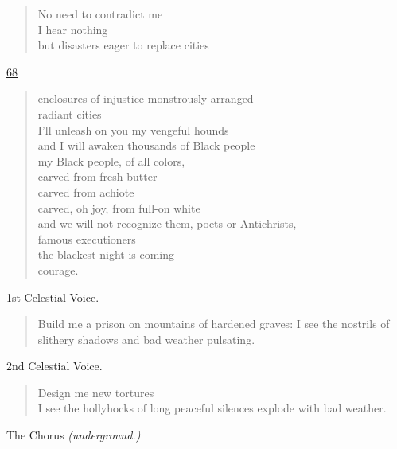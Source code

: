 \documentclass[letterpaper,article,12pt,oneside,notitlepage]{memoir}
\begin{document}
\begin{verse}
No need to contradict me \\
I hear nothing \\
but disasters eager to replace cities \\
\end{verse}

\clearpage

\href{http://cesaire.elotroalex.com/chiens/chiens/p068.html}{68}

\begin{verse}
enclosures of injustice monstrously arranged \\
radiant cities \\
I'll unleash on you my vengeful hounds \\
and I will awaken thousands of Black people \\
my Black people, of all colors, \\
carved from fresh butter \\
carved from achiote \\
carved, oh joy, from full-on white \\
and we will not recognize them, poets or Antichrists, \\
famous executioners \\
the blackest night is coming \\
courage. \\
\end{verse}

\begin{center}1st Celestial Voice.\end{center}

\begin{verse}
\indent Build me a prison on mountains of hardened graves: I see the nostrils of slithery shadows and bad weather pulsating. \\
\end{verse}

\begin{center}2nd Celestial Voice.\end{center}

\begin{verse}
\hspace{1cm} Design me new tortures \\
I see the hollyhocks of long peaceful silences explode with bad weather. \\
\end{verse}

\begin{center}The Chorus \textit{(underground.)}\end{center}
\end{document}
